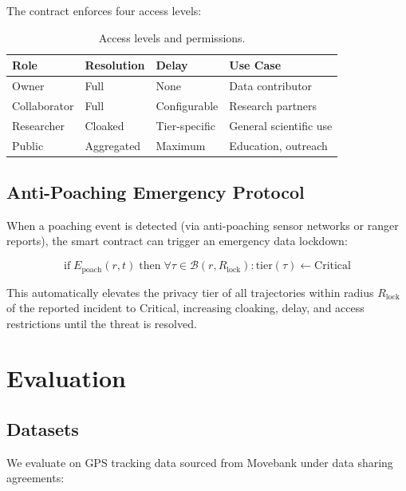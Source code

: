 \documentclass[11pt,letterpaper]{article}
\begin{document}
The contract enforces four access levels:

\begin{table}[htbp]
\centering
\caption{Access levels and permissions.}
\label{tab:access}
\begin{tabular}{lllp{5cm}}
\toprule
\textbf{Role} & \textbf{Resolution} & \textbf{Delay} & \textbf{Use Case} \\
\midrule
Owner & Full & None & Data contributor \\
Collaborator & Full & Configurable & Research partners \\
Researcher & Cloaked & Tier-specific & General scientific use \\
Public & Aggregated & Maximum & Education, outreach \\
\bottomrule
\end{tabular}
\end{table}

\subsection{Anti-Poaching Emergency Protocol}

When a poaching event is detected (via anti-poaching sensor networks or ranger reports), the smart contract can trigger an emergency data lockdown:

\begin{equation}
\text{if}\; E_{\text{poach}}(r, t) \;\text{then}\; \forall \tau \in \mathcal{B}(r, R_{\text{lock}}) : \text{tier}(\tau) \leftarrow \text{Critical}
\end{equation}

This automatically elevates the privacy tier of all trajectories within radius $R_{\text{lock}}$ of the reported incident to Critical, increasing cloaking, delay, and access restrictions until the threat is resolved.

\section{Evaluation}

\subsection{Datasets}

We evaluate on GPS tracking data sourced from Movebank under data sharing agreements:
\end{document}
